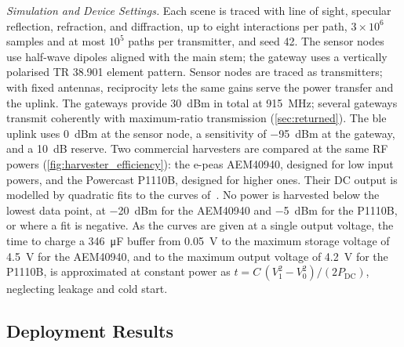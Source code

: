 \emph{Simulation and Device Settings. }
Each scene is traced with line of sight, specular reflection, refraction, and diffraction, up to eight interactions per path, $3\times10^{6}$ samples and at most $10^{5}$ paths per transmitter, and seed 42. The sensor nodes use half-wave dipoles aligned with the main stem; the gateway uses a vertically polarised TR 38.901 element pattern. Sensor nodes are traced as transmitters; with fixed antennas, reciprocity lets the same gains serve the power transfer and the uplink. The gateways provide \SI{30}{dBm} in total at \SI{915}{MHz}; several gateways transmit coherently with maximum-ratio transmission (\cref{sec:returned}). The \gls{ble} uplink uses \SI{0}{dBm} at the sensor node, a sensitivity of \SI{-95}{dBm} at the gateway, and a \SI{10}{dB} reserve. Two commercial harvesters are compared at the same RF powers (\cref{fig:harvester_efficiency}): the e-peas AEM40940, designed for low input powers, and the Powercast P1110B, designed for higher ones. Their DC output is modelled by quadratic fits to the curves of~\cite{ambient6g}. No power is harvested below the lowest data point, at \SI{-20}{dBm} for the AEM40940 and \SI{-5}{dBm} for the P1110B, or where a fit is negative. As the curves are given at a single output voltage, the time to charge a \SI{346}{\micro\farad} buffer from \SI{0.05}{V} to the maximum storage voltage of \SI{4.5}{V} for the AEM40940, and to the maximum output voltage of \SI{4.2}{V} for the P1110B, is approximated at constant power as $t=C\,(V_1^2-V_0^2)/(2P_{\mathrm{DC}})$, neglecting leakage and cold start.




\subsection{Deployment Results}

